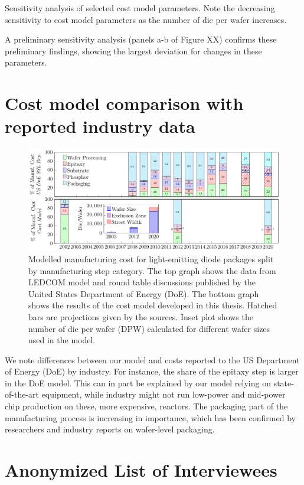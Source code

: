 \documentclass[10pt]{article}
\begin{document}
Sensitivity analysis of selected cost model parameters. Note the decreasing sensitivity to cost model parameters as the number of die per wafer increases.

A preliminary sensitivity analysis (panels a-b of Figure XX) confirms these preliminary findings, showing the largest deviation for changes in these parameters.

\section{Cost model comparison with reported industry data}

\begin{figure}
	\centering
    \includegraphics[width=\textwidth]{2_SSL_EES/article/figures/costmodel_calibration.pdf}
	\caption{Modelled manufacturing cost for light-emitting diode packages split by manufacturing step category. The top graph shows the data from LEDCOM model and round table discussions published by the United States Department of Energy (DoE). The bottom graph shows the results of the cost model developed in this thesis. Hatched bars are projections given by the sources. Inset plot shows the number of die per wafer (DPW) calculated for different wafer sizes used in the model.}
	\label{fig:costmodel_calibration}
\end{figure}

We note differences between our model and costs reported to the US Department of Energy (DoE) by industry. For instance, the share of the epitaxy step is larger in the DoE model. This can in part be explained by our model relying on state-of-the-art equipment, while industry might not run low-power and mid-power chip production on these, more expensive, reactors. The packaging part of the manufacturing process is increasing in importance, which has been confirmed by researchers and industry reports on wafer-level packaging.

\section{Anonymized List of Interviewees}
\end{document}
